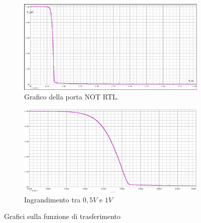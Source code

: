 \documentclass[
]{book}
\begin{document}
\begin{figure}[h] \centering \begin{subfigure}{.45\textwidth}
\includegraphics[width=\textwidth]{assets/imgs/grafico_not_rtl.png}
\caption{Grafico della porta NOT RTL.}
\label{fig:subfig1} \end{subfigure}
\hspace*{\fill}
\begin{subfigure}{.45\textwidth}
\includegraphics[width=\textwidth]{assets/imgs/ingrandimento_grafico_not.png}
\caption{Ingrandimento tra $0,5 V$ e  $1V$} \label{fig:subfig2}
\end{subfigure}
\caption{Grafici sulla funzione di trasferimento} \label{fig:grafici rtl_not}
\end{figure}
\end{document}
